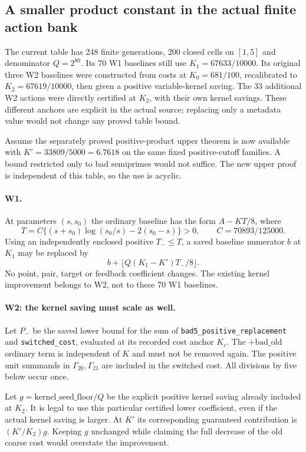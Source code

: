 \subsection{A smaller product constant in the actual finite action bank}

The current table has 248 finite generations, 200 closed cells on
$[1,5]$ and denominator $Q=2^{80}$. Its 70 W1 baselines still use
$K_{1}=67633/10000$. Its original three W2 baselines were constructed
from costs at $K_0=681/100$, recalibrated to $K_{2}=67619/10000$,
then given a positive variable-kernel saving. The 33 additional W2
actions were directly certified at $K_2$, with their own kernel savings.
These different anchors are explicit in the actual source; replacing
only a metadata value would not change any proved table bound.

Assume the separately proved positive-product upper theorem is now
available with $K'=33809/5000=6.7618$ on the same fixed positive-cutoff
families. A bound restricted only to bad semiprimes would not suffice.
The new upper proof is independent of this table, so the use is acyclic.

\paragraph{W1.}
At parameters $(s,s_0)$ the ordinary baseline has the form
$A-KT/8$, where
\[
 T=C\{(s+s_0)\log(s_0/s)-2(s_0-s)\}>0,
 \qquad C=70893/125000.
\]
Using an independently enclosed positive $T_-\le T$, a saved baseline
numerator $b$ at $K_1$ may be replaced by
\[
 b+\lfloor Q(K_1-K')T_-/8\rfloor.
\]
No point, pair, target or feedback coefficient changes. The existing
kernel improvement belongs to W2, not to these 70 W1 baselines.

\paragraph{W2: the kernel saving must scale as well.}
Let $P_-$ be the saved lower bound for the sum of
\texttt{bad5\_positive\_replacement} and \texttt{switched\_cost},
evaluated at its recorded cost anchor $K_c$. The $+\mathrm{bad\_old}$
ordinary term is independent of $K$ and must not be removed again.
The positive unit summands in $\Gamma_{20},\Gamma_{21}$ are included
in the switched cost. All divisions by five below occur once.

Let $g=\mathrm{kernel\_seed\_floor}/Q$ be the explicit positive
kernel saving already included at $K_2$. It is legal to use this
particular certified lower coefficient, even if the actual kernel
saving is larger. At $K'$ its corresponding guaranteed contribution
is $(K'/K_2)g$. Keeping $g$ unchanged while claiming the full decrease
of the old coarse cost would overstate the improvement.

